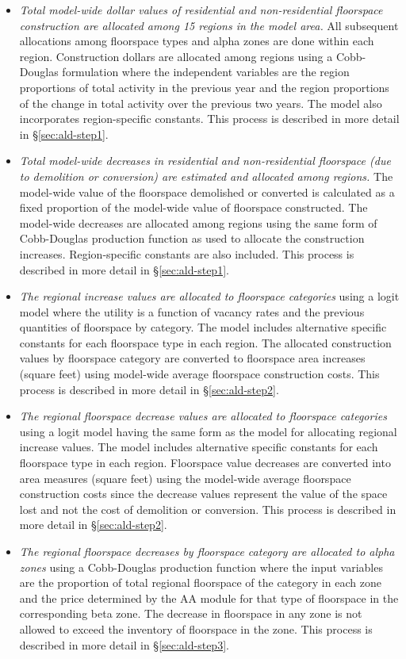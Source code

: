 \begin{itemize}
\item \textit{Total model-wide dollar values of residential and non-residential floorspace construction are allocated among 15 regions in the model area.} All subsequent allocations among floorspace types and alpha zones are done within each region. Construction dollars are allocated among regions using a Cobb-Douglas formulation where the independent variables are the region proportions of total activity in the previous year and the region proportions of the change in total activity over the previous two years. The model also incorporates region-specific constants. This process is described in more detail in \S\ref{sec:ald-step1}.
\item \textit{Total model-wide decreases in residential and non-residential floorspace (due to demolition or conversion) are estimated and allocated among regions.} The model-wide value of the floorspace demolished or converted is calculated as a fixed proportion of the model-wide value of floorspace constructed. The model-wide decreases are allocated among regions using the same form of Cobb-Douglas production function as used to allocate the construction increases. Region-specific constants are also included. This process is described in more detail in \S\ref{sec:ald-step1}.
\item \textit{The regional increase values are allocated to floorspace categories} using a logit model where the utility is a function of vacancy rates and the previous quantities of floorspace by category. The model includes alternative specific constants for each floorspace type in each region. The allocated construction values by floorspace category are converted to floorspace area increases (square feet) using model-wide average floorspace construction costs. This process is described in more detail in \S\ref{sec:ald-step2}.
\item \textit{The regional floorspace decrease values are allocated to floorspace categories} using a logit model having the same form as the model for allocating regional increase values. The model includes alternative specific constants for each floorspace type in each region. Floorspace value decreases are converted into area measures (square feet) using the model-wide average floorspace construction costs since the decrease values represent the value of the space lost and not the cost of demolition or conversion. This process is described in more detail in \S\ref{sec:ald-step2}.
\item \textit{The regional floorspace decreases by floorspace category are allocated to alpha zones} using a Cobb-Douglas production function where the input variables are the proportion of total regional floorspace of the category in each zone and the price determined by the AA module for that type of floorspace in the corresponding beta zone. The decrease in floorspace in any zone is not allowed to exceed the inventory of floorspace in the zone. This process is described in more detail in \S\ref{sec:ald-step3}.

\end{itemize}
